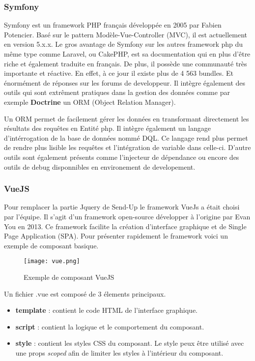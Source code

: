 \subsubsection{Symfony}
Symfony\cite{symfony} est un framework PHP français développée en 2005 par Fabien Potencier. Basé sur le pattern Modèle-Vue-Controller (MVC), il est actuellement en version 5.x.x.  Le gros avantage de Symfony sur les autres framework php du même type comme Laravel, ou CakePHP, est sa documentation qui en plus d'être riche et également traduite en français. De plus, il possède une communauté très importante et réactive. En effet, à ce jour il existe plus de 4 563 bundles. Et énormément de réponses sur les forums de developpeur. Il intègre également des outils qui sont extrêment pratiques dans la gestion des données comme par exemple \textbf{Doctrine}\cite{doctrine} un ORM (Object Relation Manager).

Un ORM permet de facilement gérer les données en transformant directement les résultats des requêtes en Entité php. Il intègre également un langage d'intérrogation de la base de données nommé DQL. Ce langage rend plus permet de rendre plus lisible les requêtes et l'intégration de variable dans celle-ci. D'autre outils sont également présents comme l'injecteur de dépendance ou encore des outils de debug disponnibles en environement de developement.  


\subsubsection{VueJS}
Pour remplacer la partie Jquery de Send-Up le framework VueJs\cite{vue} a était choisi par l'équipe. Il s'agit d'un framework open-source développer à l'origine par Evan You en 2013. Ce framework facilite la création d'interface graphique et de Single Page Application (SPA). Pour présenter rapidement le framework voici un exemple de composant basique. 

\begin{figure}[htbp]
    \center
    \texttt{[image: vue.png]}
    \caption{Exemple de composant VueJS}
\end{figure}

Un fichier .vue est composé de 3 élements principaux.
\begin{itemize}
    \item \textbf{template} : contient le code HTML de l'interface graphique.
    \item \textbf{script} : contient la logique et le comportement du composant. 
    \item \textbf{style} : contient les styles CSS du composant. Le style peux être utilisé avec une props \textit{scoped} afin de limiter les styles à l'intérieur du composant.
\end{itemize}

